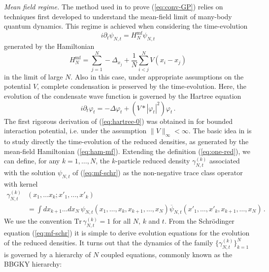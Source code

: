 \documentclass[11pt,a4paper]{article}
\newcommand{\tr}{\mbox{Tr}}
\begin{document}
\bigskip

{\it Mean field regime.} The method used in \cite{ESY0,ESY1,ESY2,ESY3,ESY4} 
to prove (\ref{eq:conv-GP}) relies on techniques first developed to understand the mean-field limit of many-body quantum dynamics. This regime is achieved when considering the time-evolution 
\begin{equation}\label{eq:mf-schr}
i\partial_t \psi_{N,t} = H_N^{\text{mf}} \psi_{N,t} 
\end{equation}
generated by the Hamiltonian
\begin{equation}\label{eq:ham-mf} H_N^{\text{mf}} = \sum_{j=1}^N -\Delta_{x_j} + \frac{1}{N} \sum_{i<j}^N V (x_i -x_j) \end{equation}
in the limit of large $N$. Also in this case, under appropriate assumptions on the potential $V$, 
complete condensation is preserved by the time-evolution. Here, the evolution of the condensate wave function is governed by the Hartree equation
\begin{equation}\label{eq:hartree-0} i\partial_t \varphi_t = -\Delta \varphi_t + \left( V * |\varphi_t|^2\right) \varphi_t \,. \end{equation}
The first rigorous derivation of (\ref{eq:hartree-0}) was obtained in
\cite{S} for bounded interaction potential, i.e. under the assumption $\| V
\|_\infty < \infty$. The basic idea in \cite{S} is to study directly the time-evolution of the reduced densities, as generated by the mean-field Hamiltonian (\ref{eq:ham-mf}). Extending the definition (\ref{eq:one-red}), we can define, for any $k=1,\dots , N$, the $k$-particle reduced density $\gamma^{(k)}_{N,t}$ associated with the solution $\psi_{N,t}$ of (\ref{eq:mf-schr}) as the non-negative trace class operator with kernel 
\begin{equation}\label{eq:kred}
\begin{split}
\gamma^{(k)}_{N,t} &(x_1, \dots x_k ; x'_1, \dots ,x'_k) \\ &= \int dx_{k+1} \dots dx_N \, \psi_{N,t} (x_1,\dots , x_k , x_{k+1}, \dots , x_N) \overline{\psi}_{N,t} (x'_1, \dots , x'_k , x_{k+1} , \dots , x_N) \, . \end{split} \end{equation}
We use the convention $\tr \, \gamma^{(k)}_{N,t} = 1$ for all $N$, $k$ and $t$. {F}rom the Schr\"odinger equation (\ref{eq:mf-schr}) it is simple to derive evolution equations for the evolution of the reduced densities. It turns out that the dynamics of the family $\{ \gamma^{(k)}_{N,t} \}_{k=1}^N$ is governed by a hierarchy of $N$ coupled equations, commonly known as the BBGKY hierarchy:
\end{document}
